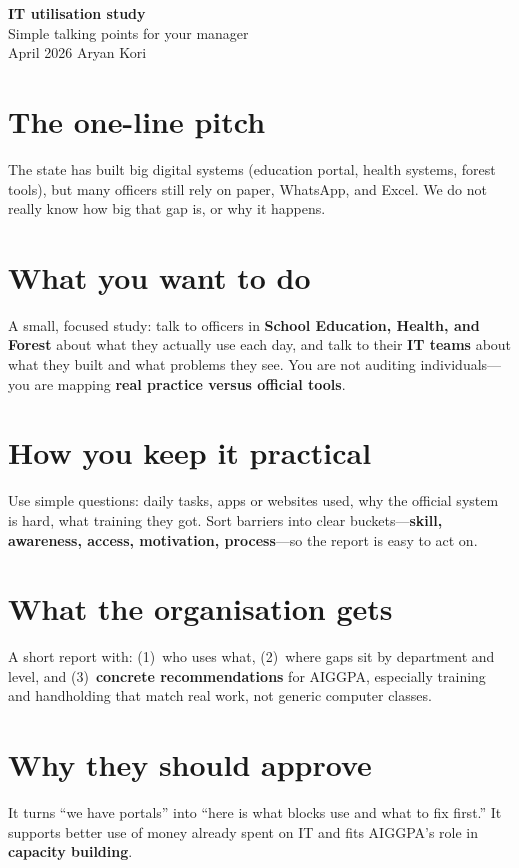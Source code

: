 \documentclass[12pt,a4paper]{article}
\begin{document}
\sloppy
\thispagestyle{empty}

\begin{center}
{\bfseries\color{heading}\LARGE IT utilisation study}\\[0.3em]
{\large Simple talking points for your manager}\\[0.5em]
{\small April 2026 \quad\textbullet\quad Aryan Kori}
\end{center}

\vspace{1em}

\section*{The one-line pitch}
The state has built big digital systems (education portal, health systems, forest tools), but many officers still rely on paper, WhatsApp, and Excel. We do not really know how big that gap is, or why it happens.

\section*{What you want to do}
A small, focused study: talk to officers in \textbf{School Education, Health, and Forest} about what they actually use each day, and talk to their \textbf{IT teams} about what they built and what problems they see. You are not auditing individuals---you are mapping \textbf{real practice versus official tools}.

\section*{How you keep it practical}
Use simple questions: daily tasks, apps or websites used, why the official system is hard, what training they got. Sort barriers into clear buckets---\textbf{skill, awareness, access, motivation, process}---so the report is easy to act on.

\section*{What the organisation gets}
A short report with: (1)~who uses what, (2)~where gaps sit by department and level, and (3)~\textbf{concrete recommendations} for AIGGPA, especially training and handholding that match real work, not generic computer classes.

\section*{Why they should approve}
It turns ``we have portals'' into ``here is what blocks use and what to fix first.'' It supports better use of money already spent on IT and fits AIGGPA's role in \textbf{capacity building}.
\end{document}
